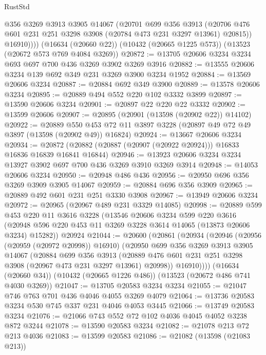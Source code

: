\begin{lexlean}{RustStd}
\begin{coremodule}
            @356
            @3269
            @3913
            @3905
            @14067
            (@20701
              @699
              @356
              @3913
              (@20706 @476 @601 @231 @251 @3298 @3908 (@20784 @473 @231 @3297 @13961) @20815))
            @16910))))
    (@16634 (@20660 @22))
    (@10432 (@20665 @1225 @573))
    (@13523 (@20672 @573 @769 @4084 @3269))
@20872 := @13705 @20606 @3234 @3234 @693 @697 @700 @436 @3269 @3902 @3269 @3916
@20882 := @13555 @20606 @3234 @139 @692 @349 @231 @3269 @3900 @3234 @1952
@20884 := @13569 @20606 @3234
@20887 := @20884 @692 @349 @3900
@20889 := @13578 @20606 @3234
@20895 := @20889 @494 @552 @220 @102 @3332 @3899
@20897 := @13590 @20606 @3234
@20901 := @20897 @22 @220 @22 @3332
@20902 := @13599 @20606
@20907 := @20895 (@20901 (@13598 (@20902 @22)) @14102)
@20922 := @20889
    @550
    @453
    @72
    @11
    @3897
    @3228
    (@20897 @49 @72 @49 @3897 (@13598 (@20902 @49)) @16824)
@20924 := @13667 @20606 @3234
@20934 := @20872 (@20882 (@20887 (@20907 (@20922 @20924))) @16833 @16836 @16839 @16841 @16844)
@20946 := @13923 @20606 @3234 @3234 @13927 @3902 @697 @700 @436 @3269 @3910 @3269 @3914
@20948 := @14053 @20606 @3234
@20950 := @20948 @486 @436
@20956 := @20950 @696 @356 @3269 @3909 @3905 @14067
@20959 := @20884 @696 @356 @3909
@20965 := @20889 @492 @601 @231 @251 @3330 @3908
@20967 := @13949 @20606 @3234
@20972 := @20965 (@20967 @489 @231 @3329 @14085)
@20998 := @20889
    @599
    @453
    @220
    @11
    @3616
    @3228
    (@13546
      @20606
      @3234
      @599
      @220
      @3616
      (@20948 @596 @220 @453 @11 @3269 @3228 @3614 @14065 (@13873 @20606 @3234) @15282))
    @20924
@21044 := @20600
    (@20861
      (@20934
        (@20946
          (@20956 (@20959 (@20972 @20998)) @16910)
          (@20950
            @699
            @356
            @3269
            @3913
            @3905
            @14067
            (@20884
              @699
              @356
              @3913
              (@20889 @476 @601 @231 @251 @3298 @3908 (@20967 @473 @231 @3297 @13961) @20998))
            @16910))))
    (@16634 (@20660 @34))
    (@10432 (@20665 @1226 @486))
    (@13523 (@20672 @486 @741 @4030 @3269))
@21047 := @13705 @20583 @3234 @3234
@21055 := @21047 @746 @763 @701 @436 @4046 @4055 @3269 @4079
@21064 := @13736 @20583 @3234 @530 @745 @337 @231 @4046 @4053 @3445
@21066 := @13749 @20583 @3234
@21076 := @21066 @743 @552 @72 @102 @4036 @4045 @4052 @3238 @872 @3244
@21078 := @13590 @20583 @3234
@21082 := @21078 @213 @72 @213 @4036
@21083 := @13599 @20583
@21086 := @21082 (@13598 (@21083 @213))

\end{coremodule}
\end{lexlean}
